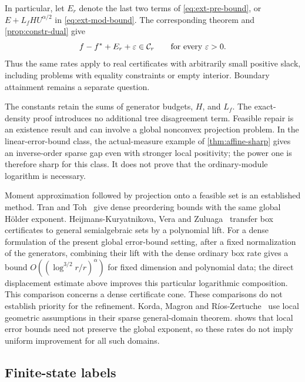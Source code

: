 In particular, let $E_r$ denote the last two terms of
\eqref{eq:ext-pre-bound}, or $E+L_fHU^{\alpha/2}$ in
\eqref{eq:ext-mod-bound}. The corresponding theorem and
\cref{prop:constr-dual} give
\[
 f-f^{*}+E_r+\varepsilon\in\mathcal C_r
 \qquad\text{for every }\varepsilon>0.
\]
Thus the same rates apply to real certificates with arbitrarily small
positive slack, including problems with equality constraints or empty
interior. Boundary attainment remains a separate question.

The constants retain the sums of generator budgets, $H$, and $L_f$.
The exact-density proof introduces no additional tree disagreement term.
Feasible repair is an existence result and can involve a global nonconvex
projection problem. In the linear-error-bound class, the actual-measure
example of \cref{thm:affine-sharp} gives an inverse-order sparse gap even
with stronger local positivity; the power one is therefore sharp for this
class. It does not prove that the ordinary-module logarithm is necessary.

\begin{remark}\label{rem:ext-prior}
Moment approximation followed by projection onto a feasible set is an
established method. Tran and Toh~\cite{tran2026-truncated-moment-sequences}
give dense preordering bounds with the same global Hölder exponent.
Heijmans-Kuryatnikova, Vera and
Zuluaga~\cite{heijmans2026-degree-bounds} transfer box certificates to
general semialgebraic sets by a polynomial lift. For a dense formulation
of the present global error-bound setting, after a fixed normalization of the generators,
combining their lift with the dense ordinary box rate gives a bound
$O((\log^{3/2}r/r)^\alpha)$ for fixed dimension and polynomial data; the direct displacement
estimate above improves this particular logarithmic composition.
This comparison concerns a dense certificate cone.
These comparisons do not establish priority for the refinement.
Korda, Magron and Ríos-Zertuche~\cite{korda2025-convergence-rates-sparsity}
use local geometric assumptions in their sparse general-domain theorem.
 shows that local error bounds need not preserve the
global exponent, so these rates do not imply uniform improvement for all
such domains.
\end{remark}

\subsection{Finite-state labels}\label{sec:ext-finite}

